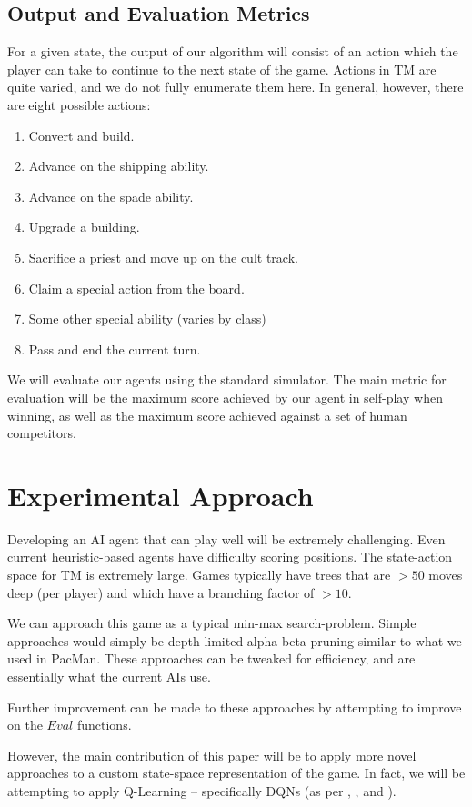\documentclass[10pt,twocolumn,letterpaper]{article}
\begin{document}
\subsection{Output and Evaluation Metrics}
For a given state, the output of our algorithm will consist of an action which the player can take to continue to the next state of the game. Actions in TM are quite varied, and we do not fully enumerate them here. In general, however, there are eight possible actions:
\begin{enumerate}
    \item Convert and build.
    \item Advance on the shipping ability.
    \item Advance on the spade ability.
    \item Upgrade a building.
    \item Sacrifice a priest and move up on the cult track.
    \item Claim a special action from the board.
    \item Some other special ability (varies by class)
    \item Pass and end the current turn.
\end{enumerate}

We will evaluate our agents using the standard simulator. The main metric for evaluation will be the maximum score achieved by our agent in self-play when winning, as well as the maximum score achieved against a set of human competitors.

\section{Experimental Approach}
\label{section:experimental_approach}
Developing an AI agent that can play well will be extremely challenging. Even current heuristic-based agents have difficulty scoring positions. The state-action space for TM is extremely large. Games typically have trees that are $>50$ moves deep (per player) and which have a branching factor of $>10$. 

We can approach this game as a typical min-max search-problem. Simple approaches would simply be depth-limited alpha-beta pruning similar to what we used in PacMan. These approaches can be tweaked for efficiency, and are essentially what the current AIs use.

Further improvement can be made to these approaches by attempting to improve on the $Eval$ functions.

However, the main contribution of this paper will be to apply more novel approaches to a custom state-space representation of the game. In fact, we will be attempting to apply Q-Learning -- specifically DQNs (as per \cite{AlphaGo}, \cite{AlphaGoZero}, and \cite{AlphaZero}). 
\end{document}
